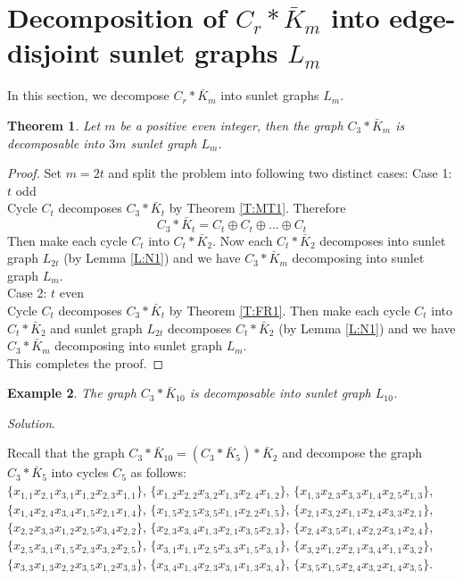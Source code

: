 \documentclass[12pt]{report}
\newtheorem{thm}{Theorem}[section]
\newtheorem{exm}[thm]{Example}
\begin{document}
\section{Decomposition of  $C_{r}*\bar{K}_{m}$ into edge-disjoint sunlet graphs $L_m$}
In this section, we decompose $C_{r}*\bar{K}_{m}$ into sunlet graphs $L_m$.
\begin{thm}
Let $m$ be a positive even integer, then the graph $ C_3*\bar{K}_m$
is decomposable into $3m$ sunlet graph $L_m$.
\end{thm}
\begin{proof}
Set $m=2t$ and split the problem into following two distinct cases:
Case 1: $t$  odd\\
Cycle $C_t$ decomposes $C_3*\bar{K}_t$ by Theorem \ref{T:MT1}.
Therefore
$$C_3*\bar{K}_t=C_t\oplus C_t\oplus...\oplus C_t$$
Then make each cycle $C_t$ into $C_t*\bar{K}_2$. Now each $C_t*\bar{K}_2$ decomposes into sunlet graph $L_{2t}$ (by Lemma \ref{L:N1}) and we have  $C_3*\bar{K}_m$ decomposing into sunlet graph $L_m$.\\
Case 2:  $t$  even\\
Cycle $C_t$ decomposes $C_3*\bar{K}_t$ by Theorem \ref{T:FR1}. Then make each cycle $C_t$ into $C_t*\bar{K}_2$ and sunlet graph $L_{2t}$ decomposes $C_t*\bar{K}_2$ (by Lemma \ref{L:N1}) and we have $C_3*\bar{K}_m$ decomposing into sunlet graph $L_m$.\\
This completes the proof.
\end{proof}
\begin{exm}\label{E:M1}
The graph $C_3*\bar{K}_{10}$ is decomposable into sunlet graph
$L_{10}$.
\end{exm}
{\em Solution}.

Recall that the graph $C_3*\bar{K}_{10}=(C_3*\bar{K}_5)*\bar{K}_2$
and decompose the graph $C_3*\bar{K}_5$ into cycles $C_5$ as
follows:\\
$\{x_{1,1}x_{2,1}x_{3,1}x_{1,2}x_{2,3}x_{1,1}\}$,
$\{x_{1,2}x_{2,2}x_{3,2}x_{1,3}x_{2,4}x_{1,2}\}$,
$\{x_{1,3}x_{2,3}x_{3,3}x_{1,4}x_{2,5}x_{1,3}\}$,\\
$\{x_{1,4}x_{2,4}x_{3,4}x_{1,5}x_{2,1}x_{1,4}\}$,
$\{x_{1,5}x_{2,5}x_{3,5}x_{1,1}x_{2,2}x_{1,5}\}$,
$\{x_{2,1}x_{3,2}x_{1,1}x_{2,4}x_{3,3}x_{2,1}\}$,\\
$\{x_{2,2}x_{3,3}x_{1,2}x_{2,5}x_{3,4}x_{2,2}\}$,
$\{x_{2,3}x_{3,4}x_{1,3}x_{2,1}x_{3,5}x_{2,3}\}$,
$\{x_{2,4}x_{3,5}x_{1,4}x_{2,2}x_{3,1}x_{2,4}\}$,\\
$\{x_{2,5}x_{3,1}x_{1,5}x_{2,3}x_{3,2}x_{2,5}\}$,
$\{x_{3,1}x_{1,1}x_{2,5}x_{3,3}x_{1,5}x_{3,1}\}$,
$\{x_{3,2}x_{1,2}x_{2,1}x_{3,4}x_{1,1}x_{3,2}\}$,\\
$\{x_{3,3}x_{1,3}x_{2,2}x_{3,5}x_{1,2}x_{3,3}\}$,
$\{x_{3,4}x_{1,4}x_{2,3}x_{3,1}x_{1,3}x_{3,4}\}$,
$\{x_{3,5}x_{1,5}x_{2,4}x_{3,2}x_{1,4}x_{3,5}\}$.
\end{document}
